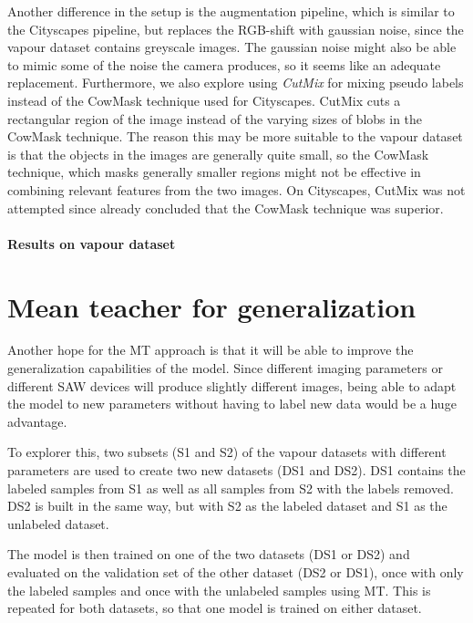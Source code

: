 Another difference in the setup is the augmentation pipeline, which is similar to the Cityscapes pipeline, but replaces the RGB-shift with gaussian noise, since the vapour dataset contains greyscale images. The gaussian noise might also be able to mimic some of the noise the camera produces, so it seems like an adequate replacement.
Furthermore, we also explore using \emph{CutMix}\cite{yunCutMixRegularizationStrategy2019} for mixing pseudo labels instead of the CowMask technique used for Cityscapes. 
CutMix cuts a rectangular region of the image instead of the varying sizes of blobs in the CowMask technique.
The reason this may be more suitable to the vapour dataset is that the objects in the images are generally quite small, so the CowMask technique, which masks generally smaller regions might not be effective in combining relevant features from the two images. On Cityscapes, CutMix was not attempted since \cite{schererPseudoLabelNoiseSuppression2022} already concluded that the CowMask technique was superior.

\paragraph{Results on vapour dataset}


\section{Mean teacher for generalization}
\label{sec:generalization}

Another hope for the MT approach is that it will be able to improve the generalization capabilities of the model. Since different imaging parameters or different SAW devices will produce slightly different images, being able to adapt the model to new parameters without having to label new data would be a huge advantage.

To explorer this, two subsets (S1 and S2) of the vapour datasets with different parameters are used to create two new datasets (DS1 and DS2). DS1 contains the labeled samples from S1 as well as all samples from S2 with the labels removed. DS2 is built in the same way, but with S2 as the labeled dataset and S1 as the unlabeled dataset.

The model is then trained on one of the two datasets (DS1 or DS2) and evaluated on the validation set of the other dataset (DS2 or DS1), once with only the labeled samples and once with the unlabeled samples using MT. This is repeated for both datasets, so that one model is trained on either dataset. 

